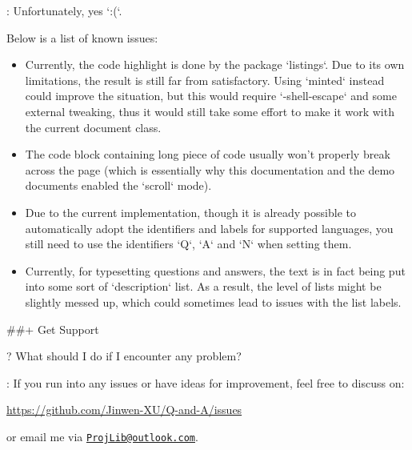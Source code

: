 \documentclass[%
  use style = classical,
  scroll,
]{Q-and-A}
\begin{document}
:
  Unfortunately, yes `:(`.

  Below is a list of known issues:

  \begin{itemize}
    \item Currently, the code highlight is done by the package `listings`. Due to its own limitations, the result is still far from satisfactory. Using `minted` instead could improve the situation, but this would require `-shell-escape` and some external tweaking, thus it would still take some effort to make it work with the current document class.
    \item The code block containing long piece of code usually won't properly break across the page (which is essentially why this documentation and the demo documents enabled the `scroll` mode).
    \item Due to the current implementation, though it is already possible to automatically adopt the identifiers and labels for supported languages, you still need to use the identifiers `Q`, `A` and `N` when setting them.
    \item Currently, for typesetting questions and answers, the text is in fact being put into some sort of `description` list. As a result, the level of lists might be slightly messed up, which could sometimes lead to issues with the list labels.
  \end{itemize}


##+ {Get Support}

?
  What should I do if I encounter any problem?

:
  If you run into any issues or have ideas for improvement, feel free to discuss on:
  \begin{center}
      \url{https://github.com/Jinwen-XU/Q-and-A/issues}
  \end{center}
  or email me via \href{mailto:ProjLib@outlook.com}{\texttt{ProjLib@outlook.com}}.


\vspace{3\baselineskip}



\end{document}
